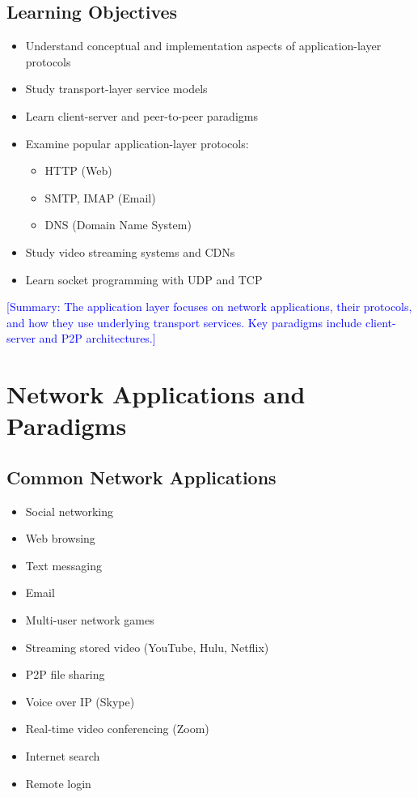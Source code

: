 \documentclass[12pt]{article}
\begin{document}
\subsection{Learning Objectives}
\begin{itemize}
    \item Understand conceptual and implementation aspects of application-layer protocols
    \item Study transport-layer service models
    \item Learn client-server and peer-to-peer paradigms
    \item Examine popular application-layer protocols:
          \begin{itemize}
              \item HTTP (Web)
              \item SMTP, IMAP (Email)
              \item DNS (Domain Name System)
          \end{itemize}
    \item Study video streaming systems and CDNs
    \item Learn socket programming with UDP and TCP
\end{itemize}

\textcolor{blue}{[Summary: The application layer focuses on network applications, their protocols, and how they use underlying transport services. Key paradigms include client-server and P2P architectures.]}

\section{Network Applications and Paradigms}

\subsection{Common Network Applications}
\begin{itemize}
    \item Social networking
    \item Web browsing
    \item Text messaging
    \item Email
    \item Multi-user network games
    \item Streaming stored video (YouTube, Hulu, Netflix)
    \item P2P file sharing
    \item Voice over IP (Skype)
    \item Real-time video conferencing (Zoom)
    \item Internet search
    \item Remote login
\end{itemize}
\end{document}
